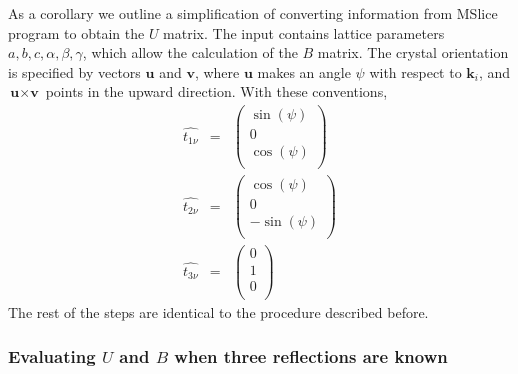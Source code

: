 \documentclass[prb]{revtex4}%
\begin{document}
As a corollary we outline a simplification of converting information from MSlice program to obtain the $U$ matrix.
The input contains lattice parameters $a, b, c, \alpha, \beta, \gamma$, which allow the calculation
of the $B$ matrix. The crystal orientation is specified by vectors $\textbf{u}$ and $\textbf{v}$, where $\textbf{u}$
makes an angle $\psi$ with respect to $\textbf{k}_i$, and $\textbf{u}\times\textbf{v}$ points in the upward direction.
With these conventions,
\begin{eqnarray}
  \nonumber \widehat{t_{1\nu}}&=&  \left(
                                     \begin{array}{c}
                                       \sin(\psi) \\
                                       0 \\
                                       \cos(\psi) \\
                                     \end{array}
                                   \right)
  \\
  \widehat{t_{2\nu}}&=&  \left(
                                     \begin{array}{c}
                                       \cos(\psi) \\
                                       0 \\
                                       -\sin(\psi) \\
                                     \end{array}
                                   \right)\\
  \nonumber \widehat{t_{3\nu}}&=& \left(
                                     \begin{array}{c}
                                       0 \\
                                       1 \\
                                       0 \\
                                     \end{array}
                                   \right)
\end{eqnarray}
The rest of the steps are identical to the procedure described before.

\subsubsection{Evaluating $U$ and $B$ when three reflections are known}
\end{document}
